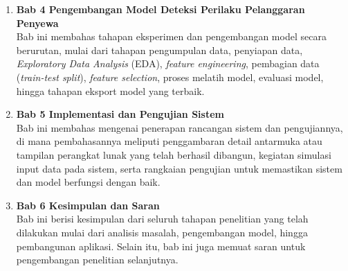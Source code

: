 \begin{enumerate}
    \item \textbf{Bab 4 Pengembangan Model Deteksi Perilaku Pelanggaran Penyewa} \\
    Bab ini membahas tahapan eksperimen dan pengembangan model secara berurutan, mulai dari tahapan pengumpulan data, penyiapan data, \textit{Exploratory Data Analysis} (EDA), \textit{feature engineering}, pembagian data (\textit{train-test split}), \textit{feature selection}, proses melatih model, evaluasi model, hingga tahapan eksport model yang terbaik.
    
    \item \textbf{Bab 5 Implementasi dan Pengujian Sistem} \\
    Bab ini membahas mengenai penerapan rancangan sistem dan pengujiannya, di mana pembahasannya meliputi penggambaran detail antarmuka atau tampilan perangkat lunak yang telah berhasil dibangun, kegiatan simulasi input data pada sistem, serta rangkaian pengujian untuk memastikan sistem dan model berfungsi dengan baik.
    
    \item \textbf{Bab 6 Kesimpulan dan Saran} \\
    Bab ini berisi kesimpulan dari seluruh tahapan penelitian yang telah dilakukan mulai dari analisis masalah, pengembangan model, hingga pembangunan aplikasi. Selain itu, bab ini juga memuat saran untuk pengembangan penelitian selanjutnya.
    

\end{enumerate}
